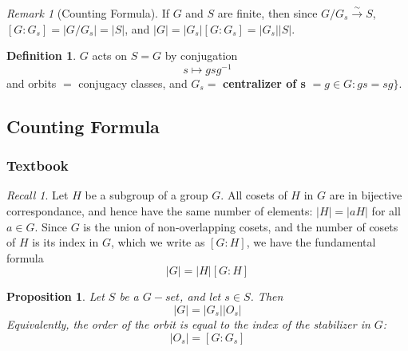 \documentclass[12pt]{article}
\newtheorem{prop}[thm]{Proposition}
\theoremstyle{definition}
\newtheorem{defn}[thm]{Definition}
\theoremstyle{remark}
\newtheorem{rmk}[thm]{Remark}
\newtheorem*{rec}{Recall}
\numberwithin{equation}{section}
\newcommand\B[1]{\textbf{ #1}}
\begin{document}
\begin{rmk}[Counting Formula]
        If $G$ and $S$ are finite, then since $G/G_s \xrightarrow{\sim} S$, $[G:G_s] = |G/G_s| = |S|$, and $|G| = |G_s|[G:G_s] = |G_s||S|$.
\end{rmk}

\vspace{15pt}

\begin{defn}
        $G$ acts on $S = G$ by conjugation \begin{equation}
                s\mapsto gsg^{-1}
        \end{equation}
        and orbits $=$ conjugacy classes, and $G_s =$ \B{centralizer of s} $= g \in G:gs=sg\}$.
\end{defn}


\subsection{Counting Formula}


\subsubsection{Textbook}

\begin{rec}
        Let $H$ be a subgroup of a group $G$. All cosets of $H$ in $G$ are in bijective correspondance, and hence have the same number of elements: $|H| = |aH|$ for all $a \in G$. Since $G$ is the union of non-overlapping cosets, and the number of cosets of $H$ is its index in $G$, which we write as $[G:H]$, we have the fundamental formula \begin{equation}
                |G| = |H|[G:H]
        \end{equation}
\end{rec}

\vspace{15pt}

\begin{prop}
        Let $S$ be a $G-set$, and let $s \in S$. Then \begin{equation}
                |G| = |G_s||O_s|
        \end{equation}
        Equivalently, the order of the orbit is equal to the index of the stabilizer in $G$:\begin{equation}
                |O_s| =[G:G_s]
        \end{equation}
\end{prop}
\end{document}
